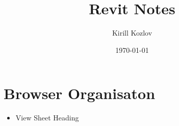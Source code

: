 \documentclass{article}
\begin{document}
\author{Kirill Kozlov}
\date{\today}
\title{Revit Notes}
\maketitle

\section{Browser Organisaton}
\begin{itemize}
\item View Sheet Heading
\end{itemize}
\end{document}
